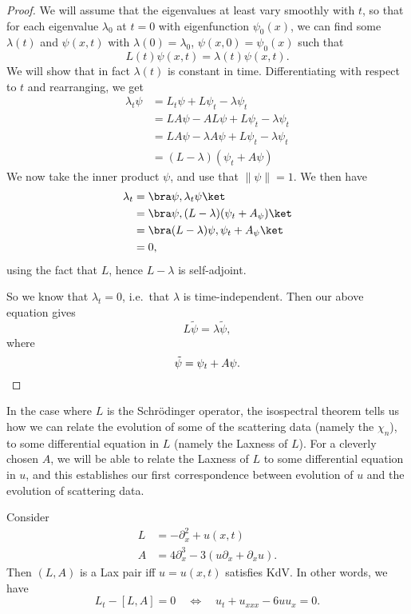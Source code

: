 \documentclass[a4paper]{article}
\begin{document}
\begin{proof}
  We will assume that the eigenvalues at least vary smoothly with $t$, so that for each eigenvalue $\lambda_0$ at $t = 0$ with eigenfunction $\psi_0(x)$, we can find some $\lambda(t)$ and $\psi(x, t)$ with $\lambda(0) = \lambda_0$, $\psi(x, 0) = \psi_0(x)$ such that
  \[
    L(t) \psi(x, t) = \lambda(t) \psi (x, t).
  \]
  We will show that in fact $\lambda(t)$ is constant in time. Differentiating with respect to $t$ and rearranging, we get
  \begin{align*}
    \lambda_t \psi &= L_t \psi + L \psi_t - \lambda \psi_t\\
    &= LA \psi - AL \psi + L \psi_t - \lambda \psi_t\\
    &= LA \psi - \lambda A \psi + L \psi_t - \lambda \psi_t\\
    &= (L - \lambda)(\psi_t + A \psi)
  \end{align*}
  We now take the inner product $\psi$, and use that $\|\psi\| = 1$. We then have
  \begin{align*}
    \lambda_t &= \bra \psi, \lambda_t \psi\ket\\
    &= \bra \psi, (L - \lambda)(\psi_t + A_\psi)\ket\\
    &= \bra (L - \lambda)\psi, \psi_t + A_\psi\ket\\
    &= 0,
  \end{align*}
  using the fact that $L$, hence $L - \lambda$ is self-adjoint.

  So we know that $\lambda_t = 0$, i.e.\ that $\lambda$ is time-independent. Then our above equation gives
  \[
    L \tilde{\psi} = \lambda \tilde{\psi},
  \]
  where
  \[
    \tilde{\psi} = \psi_t + A\psi.\qedhere
  \]
\end{proof}

In the case where $L$ is the Schr\"odinger operator, the isospectral theorem tells us how we can relate the evolution of some of the scattering data (namely the $\chi_n$), to some differential equation in $L$ (namely the Laxness of $L$). For a cleverly chosen $A$, we will be able to relate the Laxness of $L$ to some differential equation in $u$, and this establishes our first correspondence between evolution of $u$ and the evolution of scattering data.
\begin{eg}
  Consider
  \begin{align*}
    L &= -\partial_x^2 + u(x, t)\\
    A &= 4 \partial_x^3 - 3 (u \partial_x + \partial_x u).
  \end{align*}
  Then $(L, A)$ is a Lax pair iff $u = u(x, t)$ satisfies KdV. In other words, we have
  \[
    L_t - [L, A] = 0 \quad\Longleftrightarrow\quad u_t + u_{xxx} - 6uu_x =0 .
  \]
\end{eg}
\end{document}
